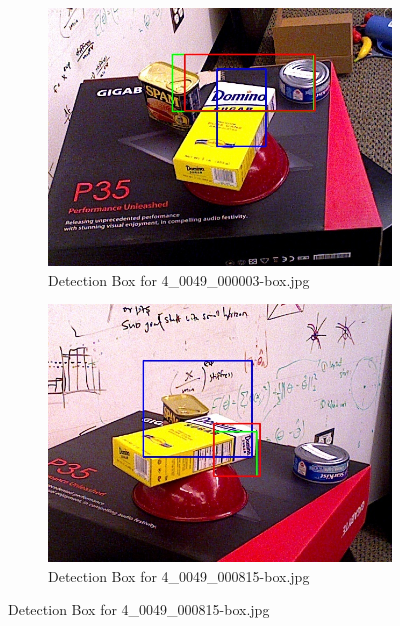 \documentclass[10.5pt,a4paper]{article}
\begin{document}
\begin{figure}[h]
    \vspace{2em}

    \begin{subfigure}{0.45\textwidth}
        \centering
        \includegraphics[width=\textwidth]{img/4_0049_000003-box.jpg}
        \caption{Detection Box for 4\_0049\_000003-box.jpg}
        \label{fig:img5}
    \end{subfigure}
    \hfill
    \begin{subfigure}{0.45\textwidth}
        \centering
        \includegraphics[width=\textwidth]{img/4_0049_000815-box.jpg}
        \caption{Detection Box for 4\_0049\_000815-box.jpg}
        \label{fig:img6}
    \end{subfigure}
    \end{figure}
\end{document}
